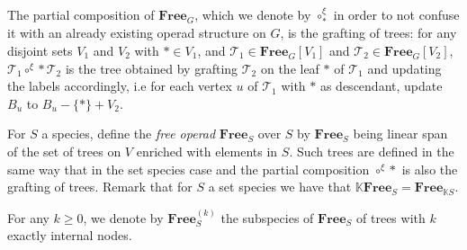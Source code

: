 \documentclass[a4paper]{article}
\theoremstyle{definition}
\newcommand{\K}{\mathbb{K}}
\newcommand{\FreeOp}{\mathbf{Free}}
\begin{document}
The partial composition of $\FreeOp_G$, which we denote by $\circ^{\xi}_{\ast}$ in order to 
not confuse it with an already existing operad structure on $G$,
is the grafting of trees: for any disjoint sets  $V_1$ and $V_2$ with $\ast\in V_1$,
 and $\mathcal{T}_1 \in\FreeOp_G[V_1]$ and $\mathcal{T}_2 \in \FreeOp_G[V_2]$, 
 $\mathcal{T}_1\circ^{\xi}{\ast} \mathcal{T}_2$ is the tree obtained by grafting 
 $\mathcal{T}_2$ on the leaf $\ast$ of $\mathcal{T}_1$ and updating the labels 
 accordingly, i.e for each vertex $u$ of $\mathcal{T}_1$ with $\ast$ as descendant,
update $B_u$ to $B_u-\{\ast\}+V_2$.

For $S$ a species, define the {\em free operad} $\FreeOp_S$ over $S$ by $\FreeOp_S$
being linear span of the set of trees on $V$ enriched with elements in $S$. Such trees 
are defined in the same way that in the set species case and the partial composition
$\circ^{\xi}{\ast}$ is also the grafting of trees.
Remark that for $S$ a set species we have that $\K\FreeOp_{S} = \FreeOp_{\K S}$.



For any $k \geq 0$, we denote by $\FreeOp_S^{(k)}$ the subspecies of $\FreeOp_S$ of trees 
with $k$ exactly internal nodes.
\end{document}
